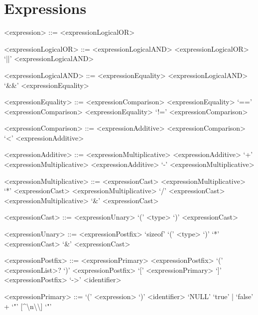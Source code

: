 \section{Expressions}

\setlength{\grammarparsep}{20pt plus 1pt minus 1pt}
\setlength{\grammarindent}{10em}
\begin{grammar}

<expression> ::= <expressionLogicalOR>

<expressionLogicalOR> ::= <expressionLogicalAND>
\alt <expressionLogicalOR> `||' <expressionLogicalAND>

<expressionLogicalAND> ::= <expressionEquality>
\alt <expressionLogicalAND> `&&' <expressionEquality>

<expressionEquality> ::= <expressionComparison>
\alt <expressionEquality> `==' <expressionComparison>
\alt <expressionEquality> `!=' <expressionComparison>

<expressionComparison> ::= <expressionAdditive>
\alt <expressionComparison> `<' <expressionAdditive>

<expressionAdditive> ::= <expressionMultiplicative>
\alt <expressionAdditive> `+' <expressionMultiplicative>
\alt <expressionAdditive> `-' <expressionMultiplicative>

<expressionMultiplicative> ::= <expressionCast>
\alt <expressionMultiplicative> `*' <expressionCast>
\alt <expressionMultiplicative> `/' <expressionCast>
\alt <expressionMultiplicative> `&' <expressionCast>

<expressionCast> ::= <expressionUnary>
\alt `(' <type> `)' <expressionCast>

<expressionUnary> ::= <expressionPostfix>
\alt `sizeof' `(' <type> `)'
\alt `*' <expressionCast>
\alt `&' <expressionCast>

<expressionPostfix> ::= <expressionPrimary>
\alt <expressionPostfix> `(' <expressionList>? `)'
\alt <expressionPostfix> `[' <expressionPrimary> `]'
\alt <expressionPostfix> `->' <identifier>

<expressionPrimary> ::= `(' <expression> `)'
\alt <identifier>
\alt `NULL'
\alt `true' | `false'
\alt [0-9]+
\alt `"' [\^{}\textquotedbl\textbackslash n\textbackslash\textbackslash] `"'

\end{grammar}
